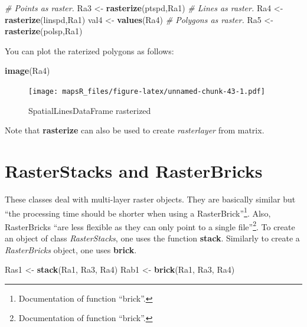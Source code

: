 \documentclass[]{report}
\newenvironment{Shaded}{\begin{snugshade}}{\end{snugshade}}
\newcommand{\KeywordTok}[1]{\textcolor[rgb]{0.13,0.29,0.53}{\textbf{{#1}}}}
\newcommand{\StringTok}[1]{\textcolor[rgb]{0.31,0.60,0.02}{{#1}}}
\newcommand{\CommentTok}[1]{\textcolor[rgb]{0.56,0.35,0.01}{\textit{{#1}}}}
\newcommand{\NormalTok}[1]{{#1}}
\let\rmarkdownfootnote\footnote%
\def\footnote{\protect\rmarkdownfootnote}
\begin{document}
\begin{Shaded}
\begin{Highlighting}[]
\CommentTok{# Points as raster.}
\NormalTok{Ra3 <-}\StringTok{ }\KeywordTok{rasterize}\NormalTok{(ptspd,Ra1)}
\CommentTok{# Lines as raster.}
\NormalTok{Ra4 <-}\StringTok{ }\KeywordTok{rasterize}\NormalTok{(linspd,Ra1)}
\NormalTok{val4 <-}\StringTok{ }\KeywordTok{values}\NormalTok{(Ra4)}
\CommentTok{# Polygons as raster.}
\NormalTok{Ra5 <-}\StringTok{ }\KeywordTok{rasterize}\NormalTok{(polsp,Ra1)}
\end{Highlighting}
\end{Shaded}

You can plot the raterized polygons as follows:

\begin{Shaded}
\begin{Highlighting}[]
\KeywordTok{image}\NormalTok{(Ra4)}
\end{Highlighting}
\end{Shaded}

\begin{figure}[htbp]
\centering
\texttt{[image: mapsR\_files/figure-latex/unnamed-chunk-43-1.pdf]}
\caption{SpatialLinesDataFrame rasterized}
\end{figure}

Note that \textbf{rasterize} can also be used to create
\emph{rasterlayer} from matrix.

\section{RasterStacks and
RasterBricks}\label{rasterstacks-and-rasterbricks}

These classes deal with multi-layer raster objects. They are basically
similar but ``the processing time should be shorter when using a
RasterBrick''\footnote{Documentation of function ``brick''.}. Also,
RasterBricks ``are less flexible as they can only point to a single
file''\footnote{Documentation of function ``brick''.}. To create an
object of class \emph{RasterStacks}, one uses the function
\textbf{stack}. Similarly to create a \emph{RasterBricks} object, one
uses \textbf{brick}.

\begin{Shaded}
\begin{Highlighting}[]
\NormalTok{Ras1 <-}\StringTok{ }\KeywordTok{stack}\NormalTok{(Ra1, Ra3, Ra4)}
\NormalTok{Rab1 <-}\StringTok{ }\KeywordTok{brick}\NormalTok{(Ra1, Ra3, Ra4)}
\end{Highlighting}
\end{Shaded}
\end{document}
